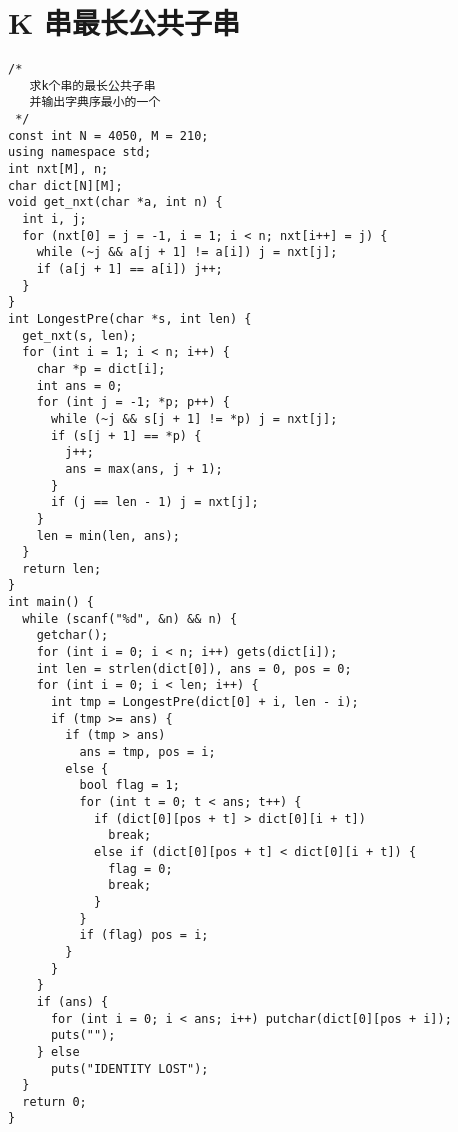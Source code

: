 \section{K 串最长公共子串}
\begin{lstlisting}
/*
   求k个串的最长公共子串
   并输出字典序最小的一个
 */
const int N = 4050, M = 210;
using namespace std;
int nxt[M], n;
char dict[N][M];
void get_nxt(char *a, int n) {
  int i, j;
  for (nxt[0] = j = -1, i = 1; i < n; nxt[i++] = j) {
    while (~j && a[j + 1] != a[i]) j = nxt[j];
    if (a[j + 1] == a[i]) j++;
  }
}
int LongestPre(char *s, int len) {
  get_nxt(s, len);
  for (int i = 1; i < n; i++) {
    char *p = dict[i];
    int ans = 0;
    for (int j = -1; *p; p++) {
      while (~j && s[j + 1] != *p) j = nxt[j];
      if (s[j + 1] == *p) {
        j++;
        ans = max(ans, j + 1);
      }
      if (j == len - 1) j = nxt[j];
    }
    len = min(len, ans);
  }
  return len;
}
int main() {
  while (scanf("%d", &n) && n) {
    getchar();
    for (int i = 0; i < n; i++) gets(dict[i]);
    int len = strlen(dict[0]), ans = 0, pos = 0;
    for (int i = 0; i < len; i++) {
      int tmp = LongestPre(dict[0] + i, len - i);
      if (tmp >= ans) {
        if (tmp > ans)
          ans = tmp, pos = i;
        else {
          bool flag = 1;
          for (int t = 0; t < ans; t++) {
            if (dict[0][pos + t] > dict[0][i + t])
              break;
            else if (dict[0][pos + t] < dict[0][i + t]) {
              flag = 0;
              break;
            }
          }
          if (flag) pos = i;
        }
      }
    }
    if (ans) {
      for (int i = 0; i < ans; i++) putchar(dict[0][pos + i]);
      puts("");
    } else
      puts("IDENTITY LOST");
  }
  return 0;
}
\end{lstlisting}
